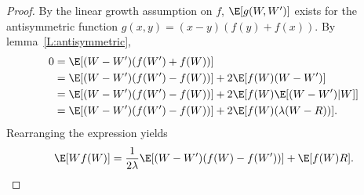 \begin{proof}
  By the linear growth assumption on $f$, $\E [g(W, W')]$ exists for the antisymmetric function
  $g(x,y) = (x-y)(f(y)+f(x))$.  By lemma~\ref{L:antisymmetric},
  \begin{equation*}
    \begin{split}
      0 &= \E [(W-W')(f(W')+f(W))] \\
      &= \E [(W-W')(f(W')-f(W))] + 2\E [f(W)(W-W')] \\
      &= \E [(W-W')(f(W')-f(W))] + 2\E [f(W)\E [(W-W')|W]] \\
      &= \E [(W-W')(f(W')-f(W))] + 2\E [f(W)(\lambda (W-R))].
    \end{split}
  \end{equation*}
  Rearranging the expression yields
  \begin{equation}
    \E [Wf(W)] = \frac{1}{2\lambda} \E [(W-W')(f(W)-f(W'))] + \E[f(W)R].
  \end{equation}
\end{proof}

